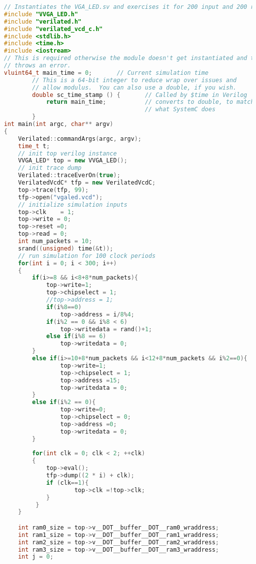\documentclass[twoside,12pt,fleqn]{book} %
\begin{document}
\begin{lstlisting}[language=C++]
// Instantiates the VGA_LED.sv and exercises it for 200 input and 200 read // cycles
#include "VVGA_LED.h"
#include "verilated.h" 
#include "verilated_vcd_c.h" 
#include <stdlib.h>
#include <time.h>
#include <iostream>
// This is required otherwise the module doesn't get instantiated and the linker
// throws an error.
vluint64_t main_time = 0;       // Current simulation time
        // This is a 64-bit integer to reduce wrap over issues and
        // allow modulus.  You can also use a double, if you wish.
        double sc_time_stamp () {       // Called by $time in Verilog
            return main_time;           // converts to double, to match
                                        // what SystemC does
        }
int main(int argc, char** argv)
{
    Verilated::commandArgs(argc, argv);
    time_t t;
    // init top verilog instance
    VVGA_LED* top = new VVGA_LED();
    // init trace dump
    Verilated::traceEverOn(true);
    VerilatedVcdC* tfp = new VerilatedVcdC;
    top->trace(tfp, 99);
    tfp->open("vgaled.vcd");
    // initialize simulation inputs
    top->clk    = 1;
    top->write = 0;
    top->reset =0;
    top->read = 0;
    int num_packets = 10;
    srand((unsigned) time(&t));
    // run simulation for 100 clock periods
    for(int i = 0; i < 300; i++)
    {   
        if(i>=8 && i<8+8*num_packets){
            top->write=1;
            top->chipselect = 1;
            //top->address = 1;
            if(i%8==0)
                top->address = i/8%4;
            if(i%2 == 0 && i%8 < 6)
                top->writedata = rand()+1;
            else if(i%8 == 6)
                top->writedata = 0;
        }
        else if(i>=10+8*num_packets && i<12+8*num_packets && i%2==0){
                top->write=1;
                top->chipselect = 1;
                top->address =15;
                top->writedata = 0;
        }
        else if(i%2 == 0){
                top->write=0;
                top->chipselect = 0;
                top->address =0;
                top->writedata = 0;
        }
        
        for(int clk = 0; clk < 2; ++clk)
        {
            top->eval();
            tfp->dump((2 * i) + clk);
            if (clk==1){
                    top->clk =!top->clk;
            }
         }
    }

    int ram0_size = top->v__DOT__buffer__DOT__ram0_wraddress;
    int ram1_size = top->v__DOT__buffer__DOT__ram1_wraddress;
    int ram2_size = top->v__DOT__buffer__DOT__ram2_wraddress;
    int ram3_size = top->v__DOT__buffer__DOT__ram3_wraddress;
    int j = 0;



\end{lstlisting}
\end{document}
